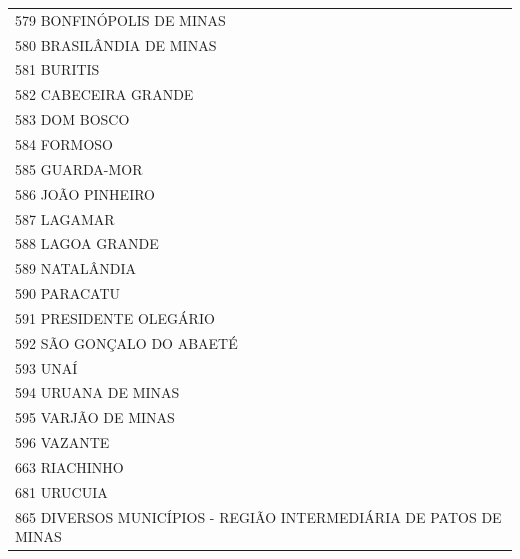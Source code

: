 \documentclass{article}
\begin{document}
\begin{longtable}[c]{m{18cm}}
\multicolumn{1}{l}{ \hspace{2em} 579 BONFINÓPOLIS DE MINAS } \\
\multicolumn{1}{l}{ \hspace{2em} 580 BRASILÂNDIA DE MINAS } \\
\multicolumn{1}{l}{ \hspace{2em} 581 BURITIS } \\
\multicolumn{1}{l}{ \hspace{2em} 582 CABECEIRA GRANDE } \\
\multicolumn{1}{l}{ \hspace{2em} 583 DOM BOSCO } \\
\multicolumn{1}{l}{ \hspace{2em} 584 FORMOSO } \\
\multicolumn{1}{l}{ \hspace{2em} 585 GUARDA-MOR } \\
\multicolumn{1}{l}{ \hspace{2em} 586 JOÃO PINHEIRO } \\
\multicolumn{1}{l}{ \hspace{2em} 587 LAGAMAR } \\
\multicolumn{1}{l}{ \hspace{2em} 588 LAGOA GRANDE } \\
\multicolumn{1}{l}{ \hspace{2em} 589 NATALÂNDIA } \\
\multicolumn{1}{l}{ \hspace{2em} 590 PARACATU } \\
\multicolumn{1}{l}{ \hspace{2em} 591 PRESIDENTE OLEGÁRIO } \\
\multicolumn{1}{l}{ \hspace{2em} 592 SÃO GONÇALO DO ABAETÉ } \\
\multicolumn{1}{l}{ \hspace{2em} 593 UNAÍ } \\
\multicolumn{1}{l}{ \hspace{2em} 594 URUANA DE MINAS } \\
\multicolumn{1}{l}{ \hspace{2em} 595 VARJÃO DE MINAS } \\
\multicolumn{1}{l}{ \hspace{2em} 596 VAZANTE } \\
\multicolumn{1}{l}{ \hspace{2em} 663 RIACHINHO } \\
\multicolumn{1}{l}{ \hspace{2em} 681 URUCUIA } \\
\multicolumn{1}{l}{ \hspace{2em} 865 DIVERSOS MUNICÍPIOS - REGIÃO INTERMEDIÁRIA DE PATOS DE MINAS } \\
\end{longtable}
\end{document}
